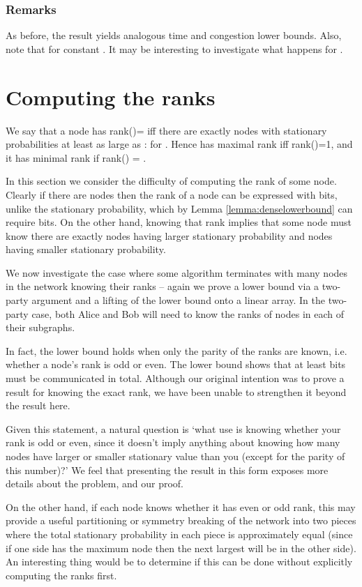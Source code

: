 \documentclass[twocolumn]{article}
\begin{document}
\subsubsection{Remarks}
As before, the result yields analogous time and congestion lower bounds. Also, note that  for constant . It may be interesting to investigate what happens for .

\section{Computing the ranks}
\label{section:computing_ranks}
We say that a node  has rank()= iff there are exactly  nodes  with stationary probabilities at least as large as :  for . Hence  has maximal rank iff rank()=1, and it has minimal rank if rank() = .

In this section we consider the difficulty of computing the rank of some node. Clearly if there are  nodes then the rank of a node can be expressed with  bits, unlike the stationary probability, which by Lemma \ref{lemma:denselowerbound} can require  bits. On the other hand, knowing that rank implies that some node must know there are exactly  nodes having larger stationary probability and  nodes having smaller stationary probability.



We now investigate the case where some algorithm terminates with many nodes in the network knowing their ranks -- again we prove a lower bound via a two-party argument and a lifting of the lower bound onto a linear array. In the two-party case, both Alice and Bob will need to know the ranks of  nodes in each of their subgraphs.

In fact, the lower bound holds when only the parity of the ranks are known, i.e. whether a node's rank is odd or even. The lower bound shows
that at least  bits must be communicated in total. Although our original intention was to prove a result for knowing the exact rank, we have been unable to strengthen it beyond the result here.

Given this statement, a natural question is `what use is knowing whether your rank is odd or even, since it doesn't imply anything
about knowing how many nodes have larger or smaller stationary value than you
(except for the parity of this number)?' We feel that presenting the result in this form exposes more details about the problem, and our proof.

On the other hand, if each node
knows whether it has even or odd rank, this may provide a useful
partitioning or symmetry breaking of the network into two pieces where the
total stationary probability in each piece is approximately equal (since if
one side has the maximum node then the next largest will be in the other
side). An interesting thing would be to determine if this can be done
without explicitly computing the ranks first.
\end{document}
